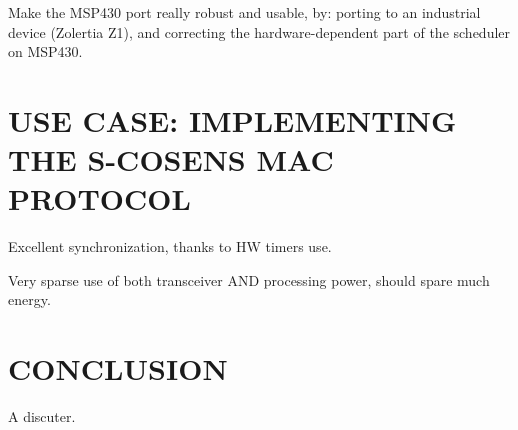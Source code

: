 \documentclass[a4paper,twoside]{article}
\begin{document}
Make the MSP430 port really robust and usable, by:
porting to an industrial device (Zolertia Z1), and
correcting the hardware-dependent part of the scheduler on MSP430.

\section{\uppercase{Use Case: implementing the S-CoSenS MAC protocol}}

Excellent synchronization, thanks to HW timers use.

Very sparse use of both transceiver AND processing power,
should spare much energy.

\section{\uppercase{Conclusion}}

A discuter.

\vfill

{\small
}
\end{document}
